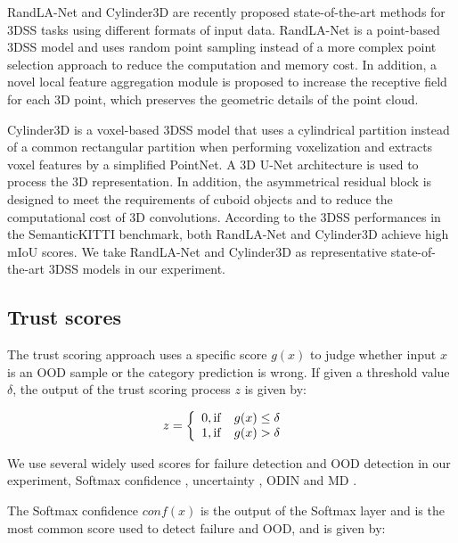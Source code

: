 \documentclass[journal]{IEEEtran}
\begin{document}
RandLA-Net and Cylinder3D are recently proposed state-of-the-art methods for 3DSS tasks using different formats of input data. RandLA-Net is a point-based 3DSS model and uses random point sampling instead of a more complex point selection approach to reduce the computation and memory cost. In addition, a novel local feature aggregation module is proposed to increase the receptive field for each 3D point, which preserves the geometric details of the point cloud.

Cylinder3D is a voxel-based 3DSS model that uses a cylindrical partition instead of a common rectangular partition when performing voxelization and extracts voxel features by a simplified PointNet. A 3D U-Net architecture is used to process the 3D representation. In addition, the asymmetrical residual block is designed to meet the requirements of cuboid objects and to reduce the computational cost of 3D convolutions. According to the 3DSS performances in the SemanticKITTI \cite{behley2019semantickitti} benchmark, both RandLA-Net and Cylinder3D achieve high mIoU scores. We take RandLA-Net and Cylinder3D as representative state-of-the-art 3DSS models in our experiment. 


\subsection{Trust scores}
The trust scoring approach uses a specific score $g(x)$ to judge whether input $x$ is an OOD sample or the category prediction is wrong. If given a threshold value $\delta$, the output of the trust scoring process $z$ is given by:

\begin{equation}
z = 
\left\{
\begin{array}{lr}
0, {\rm if \quad} g(x)\leq \delta &  \\
1, {\rm if \quad} g(x)>\delta &  
\end{array} \label{eq:gx}
\right. 
\end{equation}

We use several widely used scores for failure detection and OOD detection in our experiment, Softmax confidence \cite{hendrycks2016baseline}, uncertainty \cite{malinin2019uncertainty}, ODIN \cite{liang2017enhancing} and MD \cite{lee2018simple}. 

The Softmax confidence $conf(x)$ is the output of the Softmax layer and is the most common score used to detect failure and OOD, and is given by:
\end{document}
